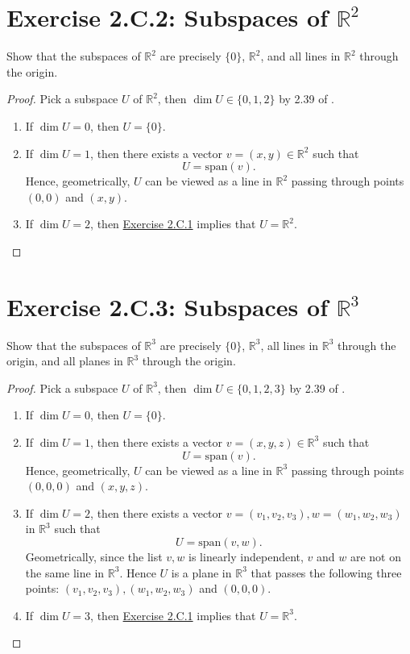 \section{Exercise 2.C.2: Subspaces of $\mathbb{R}^2$}
Show that the subspaces of $\mathbb{R}^2$ are precisely $\{0\}$, $\mathbb{R}^2$, and all lines in $\mathbb{R}^2$ through the origin.
\begin{proof}
Pick a subspace $U$ of $\mathbb{R}^2$, then $\dim U\in\{0,1,2\}$ by 2.39 of \cite{axler2014linear}.
\begin{enumerate}
\item If $\dim U=0$, then $U=\{0\}$.
\item If $\dim U=1$, then there exists a vector $v=(x,y)\in\mathbb{R}^2$ such that\[
U=\text{span}(v).
\]Hence, geometrically, $U$ can be viewed as a line in $\mathbb{R}^2$ passing through points $(0,0)$ and $(x,y)$.
\item If $\dim U=2$, then \hyperref[Exercise 2.C.1]{Exercise 2.C.1} implies that $U=\mathbb{R}^2$.
\end{enumerate}
\end{proof}

\section{Exercise 2.C.3: Subspaces of $\mathbb{R}^3$}
Show that the subspaces of $\mathbb{R}^3$ are precisely $\{0\}$, $\mathbb{R}^3$, all lines in $\mathbb{R}^3$ through the origin, and all planes in $\mathbb{R}^3$ through the origin.
\begin{proof}
Pick a subspace $U$ of $\mathbb{R}^3$, then $\dim U\in\{0,1,2,3\}$ by 2.39 of \cite{axler2014linear}.
\begin{enumerate}
\item If $\dim U=0$, then $U=\{0\}$.
\item If $\dim U=1$, then there exists a vector $v=(x,y,z)\in\mathbb{R}^3$ such that\[
U=\text{span}(v).
\]Hence, geometrically, $U$ can be viewed as a line in $\mathbb{R}^3$ passing through points $(0,0,0)$ and $(x,y,z)$.
\item If $\dim U=2$, then there exists a vector $v=(v_1,v_2,v_3), w=(w_1,w_2,w_3)$ in $\mathbb{R}^3$ such that\[
U=\text{span}(v,w).
\]Geometrically, since the list $v,w$ is linearly independent, $v$ and $w$ are not on the same line in $\mathbb{R}^3$. Hence $U$ is a plane in $\mathbb{R}^3$ that passes the following three points: $(v_1,v_2,v_3), (w_1,w_2,w_3)$ and $(0,0,0)$. 
\item If $\dim U=3$, then \hyperref[Exercise 2.C.1]{Exercise 2.C.1} implies that $U=\mathbb{R}^3$.
\end{enumerate}
\end{proof}

